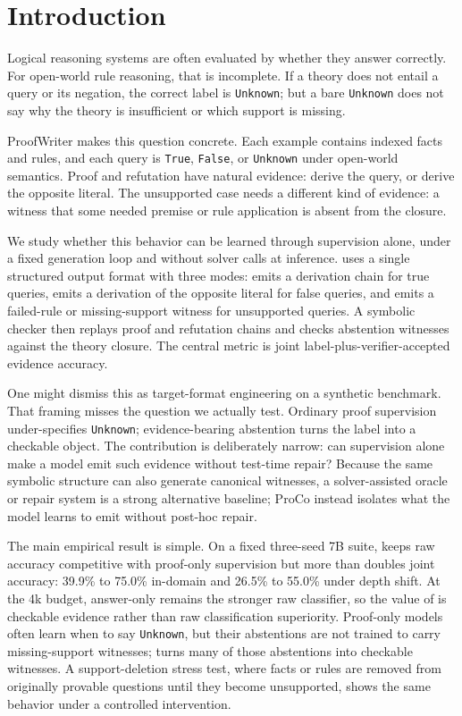 \section{Introduction}

Logical reasoning systems are often evaluated by whether they answer correctly.
For open-world rule reasoning, that is incomplete. If a theory does not entail a
query or its negation, the correct label is \texttt{Unknown}; but a bare
\texttt{Unknown} does not say why the theory is insufficient or which support is
missing.

ProofWriter \citep{tafjord2020proofwriter} makes this question concrete. Each
example contains indexed facts and rules, and each query is \texttt{True},
\texttt{False}, or \texttt{Unknown} under open-world semantics. Proof and
refutation have natural evidence: derive the query, or derive the opposite
literal. The unsupported case needs a different kind of evidence: a witness
that some needed premise or rule application is absent from the closure.

We study whether this behavior can be learned through supervision alone, under a
fixed generation loop and without solver calls at inference. \model{} uses a
single structured output format with three modes:
\prove{} emits a derivation chain for true queries,  emits a derivation
of the opposite literal for false queries, and \abstain{} emits a failed-rule or
missing-support witness for unsupported queries. A symbolic checker then
replays proof and refutation chains and checks abstention witnesses against the
theory closure. The central metric is joint label-plus-verifier-accepted
evidence accuracy.

One might dismiss this as target-format engineering on a synthetic benchmark.
That framing misses the question we actually test. Ordinary proof supervision
under-specifies \texttt{Unknown}; evidence-bearing abstention turns the label
into a checkable object. The contribution is deliberately narrow: can
supervision alone make a model emit such evidence without test-time repair?
Because the same symbolic structure can also generate canonical witnesses, a
solver-assisted oracle or repair system is a strong alternative baseline; ProCo
instead isolates what the model learns to emit without post-hoc repair.

The main empirical result is simple. On a fixed three-seed 7B suite,
\model{} keeps raw accuracy competitive with proof-only supervision but more
than doubles joint accuracy: 39.9\% to 75.0\% in-domain and 26.5\% to 55.0\%
under depth shift. At the 4k budget, answer-only remains the stronger raw
classifier, so the value of \model{} is checkable evidence rather than raw
classification superiority. Proof-only models often learn when to say
\texttt{Unknown}, but their abstentions are not trained to carry missing-support
witnesses; \model{} turns many of those abstentions into checkable witnesses. A
support-deletion stress test, where facts or rules are removed from originally
provable questions until they become unsupported, shows the same behavior under
a controlled intervention.

